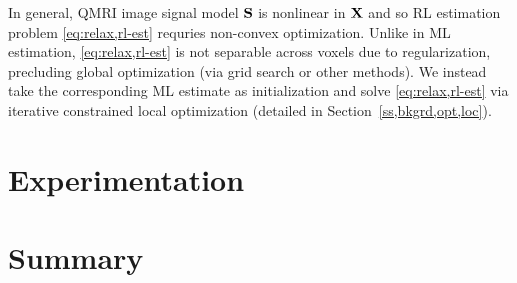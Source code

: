 In general, 
QMRI image signal model $\mathbf{S}$ is nonlinear in $\mathbf{X}$
and so RL estimation problem \eqref{eq:relax,rl-est}
requries non-convex optimization.
Unlike in ML estimation,
\eqref{eq:relax,rl-est} is not separable across voxels
due to regularization, 
precluding global optimization
(via grid search or other methods).
We instead take the corresponding ML estimate
as initialization
and solve \eqref{eq:relax,rl-est} 
via iterative constrained local optimization
(detailed in Section~\ref{ss,bkgrd,opt,loc}).


\section{Experimentation}
\label{s,relax,exp}

\section{Summary}
\label{s,relax,summ}
